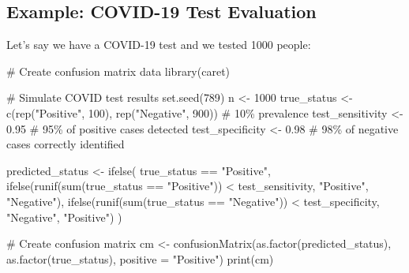 \documentclass[
  11pt,
  letterpaper,
  oneside]{book}
\newenvironment{Shaded}{\begin{snugshade}}{\end{snugshade}}
\newcommand{\AttributeTok}[1]{\textcolor[rgb]{0.40,0.45,0.13}{#1}}
\newcommand{\CommentTok}[1]{\textcolor[rgb]{0.37,0.37,0.37}{#1}}
\newcommand{\DecValTok}[1]{\textcolor[rgb]{0.68,0.00,0.00}{#1}}
\newcommand{\FloatTok}[1]{\textcolor[rgb]{0.68,0.00,0.00}{#1}}
\newcommand{\FunctionTok}[1]{\textcolor[rgb]{0.28,0.35,0.67}{#1}}
\newcommand{\NormalTok}[1]{\textcolor[rgb]{0.00,0.23,0.31}{#1}}
\newcommand{\OtherTok}[1]{\textcolor[rgb]{0.00,0.23,0.31}{#1}}
\newcommand{\SpecialCharTok}[1]{\textcolor[rgb]{0.37,0.37,0.37}{#1}}
\newcommand{\StringTok}[1]{\textcolor[rgb]{0.13,0.47,0.30}{#1}}
\begin{document}
\subsection{Example: COVID-19 Test
Evaluation}\label{example-covid-19-test-evaluation}

Let's say we have a COVID-19 test and we tested 1000 people:

\begin{Shaded}
\begin{Highlighting}[]
\CommentTok{\# Create confusion matrix data}
\FunctionTok{library}\NormalTok{(caret)}

\CommentTok{\# Simulate COVID test results}
\FunctionTok{set.seed}\NormalTok{(}\DecValTok{789}\NormalTok{)}
\NormalTok{n }\OtherTok{\textless{}{-}} \DecValTok{1000}
\NormalTok{true\_status }\OtherTok{\textless{}{-}} \FunctionTok{c}\NormalTok{(}\FunctionTok{rep}\NormalTok{(}\StringTok{"Positive"}\NormalTok{, }\DecValTok{100}\NormalTok{), }\FunctionTok{rep}\NormalTok{(}\StringTok{"Negative"}\NormalTok{, }\DecValTok{900}\NormalTok{))  }\CommentTok{\# 10\% prevalence}
\NormalTok{test\_sensitivity }\OtherTok{\textless{}{-}} \FloatTok{0.95}  \CommentTok{\# 95\% of positive cases detected}
\NormalTok{test\_specificity }\OtherTok{\textless{}{-}} \FloatTok{0.98}  \CommentTok{\# 98\% of negative cases correctly identified}

\NormalTok{predicted\_status }\OtherTok{\textless{}{-}} \FunctionTok{ifelse}\NormalTok{(}
\NormalTok{  true\_status }\SpecialCharTok{==} \StringTok{"Positive"}\NormalTok{,}
  \FunctionTok{ifelse}\NormalTok{(}\FunctionTok{runif}\NormalTok{(}\FunctionTok{sum}\NormalTok{(true\_status }\SpecialCharTok{==} \StringTok{"Positive"}\NormalTok{)) }\SpecialCharTok{\textless{}}\NormalTok{ test\_sensitivity, }\StringTok{"Positive"}\NormalTok{, }\StringTok{"Negative"}\NormalTok{),}
  \FunctionTok{ifelse}\NormalTok{(}\FunctionTok{runif}\NormalTok{(}\FunctionTok{sum}\NormalTok{(true\_status }\SpecialCharTok{==} \StringTok{"Negative"}\NormalTok{)) }\SpecialCharTok{\textless{}}\NormalTok{ test\_specificity, }\StringTok{"Negative"}\NormalTok{, }\StringTok{"Positive"}\NormalTok{)}
\NormalTok{)}

\CommentTok{\# Create confusion matrix}
\NormalTok{cm }\OtherTok{\textless{}{-}} \FunctionTok{confusionMatrix}\NormalTok{(}\FunctionTok{as.factor}\NormalTok{(predicted\_status), }\FunctionTok{as.factor}\NormalTok{(true\_status), }\AttributeTok{positive =} \StringTok{"Positive"}\NormalTok{)}
\FunctionTok{print}\NormalTok{(cm)}


\end{Highlighting}
\end{Shaded}
\end{document}
